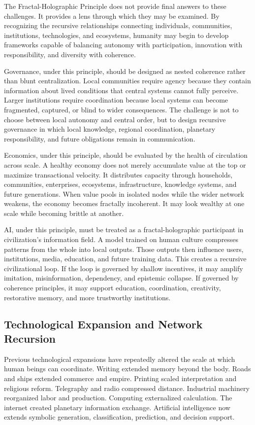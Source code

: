 \documentclass[12pt]{article}
\begin{document}
The Fractal-Holographic Principle does not provide final answers to these challenges. It provides a lens through which they may be examined. By recognizing the recursive relationships connecting individuals, communities, institutions, technologies, and ecosystems, humanity may begin to develop frameworks capable of balancing autonomy with participation, innovation with responsibility, and diversity with coherence.

Governance, under this principle, should be designed as nested coherence rather than blunt centralization. Local communities require agency because they contain information about lived conditions that central systems cannot fully perceive. Larger institutions require coordination because local systems can become fragmented, captured, or blind to wider consequences. The challenge is not to choose between local autonomy and central order, but to design recursive governance in which local knowledge, regional coordination, planetary responsibility, and future obligations remain in communication.

Economics, under this principle, should be evaluated by the health of circulation across scale. A healthy economy does not merely accumulate value at the top or maximize transactional velocity. It distributes capacity through households, communities, enterprises, ecosystems, infrastructure, knowledge systems, and future generations. When value pools in isolated nodes while the wider network weakens, the economy becomes fractally incoherent. It may look wealthy at one scale while becoming brittle at another.

AI, under this principle, must be treated as a fractal-holographic participant in civilization's information field. A model trained on human culture compresses patterns from the whole into local outputs. Those outputs then influence users, institutions, media, education, and future training data. This creates a recursive civilizational loop. If the loop is governed by shallow incentives, it may amplify imitation, misinformation, dependency, and epistemic collapse. If governed by coherence principles, it may support education, coordination, creativity, restorative memory, and more trustworthy institutions.

\subsection{Technological Expansion and Network Recursion}

Previous technological expansions have repeatedly altered the scale at which human beings can coordinate. Writing extended memory beyond the body. Roads and ships extended commerce and empire. Printing scaled interpretation and religious reform. Telegraphy and radio compressed distance. Industrial machinery reorganized labor and production. Computing externalized calculation. The internet created planetary information exchange. Artificial intelligence now extends symbolic generation, classification, prediction, and decision support.
\end{document}
